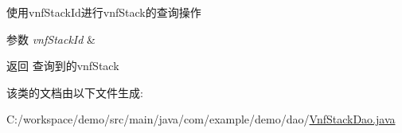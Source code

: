 使用vnf\+Stack\+Id进行vnf\+Stack的查询操作 
\begin{DoxyParams}{参数}
{\em vnf\+Stack\+Id} & \\
\hline
\end{DoxyParams}
\begin{DoxyReturn}{返回}
查询到的vnf\+Stack 
\end{DoxyReturn}


该类的文档由以下文件生成\+:\begin{DoxyCompactItemize}
\item 
C\+:/workspace/demo/src/main/java/com/example/demo/dao/\mbox{\hyperlink{_vnf_stack_dao_8java}{Vnf\+Stack\+Dao.\+java}}\end{DoxyCompactItemize}
